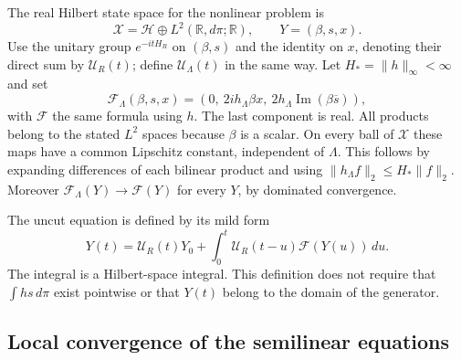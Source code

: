 \documentclass[11pt]{article}
\theoremstyle{remark}
\begin{document}
The real Hilbert state space for the nonlinear problem is
\[
 \mathcal X=\mathcal H\oplus L^2(\mathbb R,d\pi;\mathbb R),
 \qquad Y=(\beta,s,x).
\]
Use the unitary group \(e^{-itH_R}\) on \((\beta,s)\)
and the identity on \(x\), denoting their direct sum by
\(\mathcal U_R(t)\); define \(\mathcal U_\Lambda(t)\)
in the same way.  Let \(H_*=\|h\|_\infty<\infty\) and set
\[
 \mathcal F_\Lambda(\beta,s,x)=
       (0,\ 2ih_\Lambda\beta x,\
                       2h_\Lambda\operatorname{Im}(\beta\overline s)),
\]
with \(\mathcal F\) the same formula using \(h\).
The last component is real.  All products belong to
the stated \(L^2\) spaces because \(\beta\) is a scalar.
On every ball of \(\mathcal X\) these maps have a
common Lipschitz constant, independent of \(\Lambda\).
This follows by expanding differences of each bilinear
product and using
\(\|h_\Lambda f\|_2\leq H_*\|f\|_2\).
Moreover \(\mathcal F_\Lambda(Y)\to\mathcal F(Y)\)
for every \(Y\), by dominated convergence.

The uncut equation is defined by its mild form
\[
 Y(t)=\mathcal U_R(t)Y_0+
              \int_0^t\mathcal U_R(t-u)\mathcal F(Y(u))\,du .
\]
The integral is a Hilbert-space integral.  This definition
does not require that \(\int h s\,d\pi\) exist pointwise
or that \(Y(t)\) belong to the domain of the generator.

\subsection{Local convergence of the semilinear equations}
\end{document}
